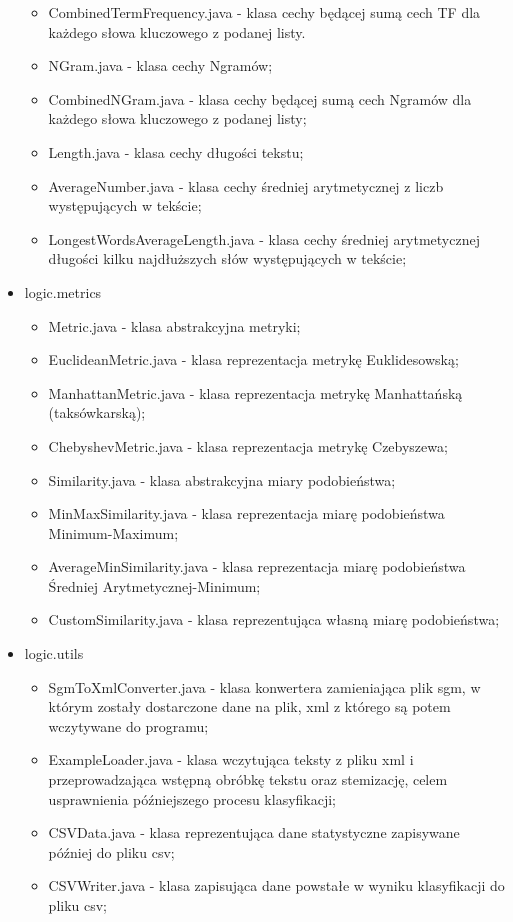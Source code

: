 \documentclass{classrep}
\begin{document}
\begin{itemize}
\begin{itemize}
		\item CombinedTermFrequency.java - klasa cechy będącej sumą cech TF dla każdego słowa kluczowego z podanej listy.
		\item NGram.java - klasa cechy Ngramów;
		\item CombinedNGram.java - klasa cechy będącej sumą cech Ngramów dla każdego słowa kluczowego z podanej listy;
		\item Length.java - klasa cechy długości tekstu;
		\item AverageNumber.java - klasa cechy średniej arytmetycznej z liczb występujących w tekście;
		\item LongestWordsAverageLength.java - klasa cechy średniej arytmetycznej długości kilku najdłuższych słów występujących w tekście;
	\end{itemize}
	\item logic.metrics
	\begin{itemize}
		\item Metric.java - klasa abstrakcyjna metryki;
		\item EuclideanMetric.java - klasa reprezentacja metrykę Euklidesowską;
		\item ManhattanMetric.java - klasa reprezentacja metrykę Manhattańską (taksówkarską);
		\item ChebyshevMetric.java - klasa reprezentacja metrykę Czebyszewa;
		\item Similarity.java - klasa abstrakcyjna miary podobieństwa;
		\item MinMaxSimilarity.java - klasa reprezentacja miarę podobieństwa Minimum-Maximum;
		\item AverageMinSimilarity.java - klasa reprezentacja miarę podobieństwa Średniej Arytmetycznej-Minimum;
		\item CustomSimilarity.java - klasa reprezentująca własną miarę podobieństwa;
	\end{itemize}
	\item logic.utils
	\begin{itemize}
		\item SgmToXmlConverter.java - klasa konwertera zamieniająca plik sgm, w którym zostały dostarczone dane na plik, xml z którego są potem wczytywane do programu;
		\item ExampleLoader.java - klasa wczytująca teksty z pliku xml i przeprowadzająca wstępną obróbkę tekstu oraz stemizację, celem usprawnienia późniejszego procesu klasyfikacji;
		\item CSVData.java - klasa reprezentująca dane statystyczne zapisywane później do pliku csv;
		\item CSVWriter.java - klasa zapisująca dane powstałe w wyniku klasyfikacji do pliku csv;
	\end{itemize}
\end{itemize}
\end{document}
